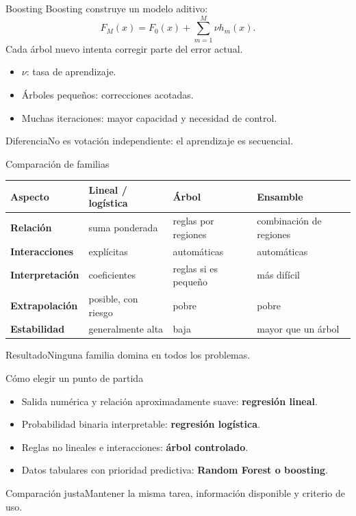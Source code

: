 \documentclass[aspectratio=169,10pt]{beamer}
\newcommand{\concepto}[1]{\textcolor{UAPTeal}{\textbf{#1}}}
\begin{document}
\begin{frame}{Boosting}
  \small
  Boosting construye un modelo aditivo:
  \[F_M(x)=F_0(x)+\sum_{m=1}^{M}\nu h_m(x).\]
  Cada árbol nuevo intenta corregir parte del error actual.
  \begin{itemize}
    \item $\nu$: tasa de aprendizaje.
    \item Árboles pequeños: correcciones acotadas.
    \item Muchas iteraciones: mayor capacidad y necesidad de control.
  \end{itemize}
  \begin{alertblock}{Diferencia}No es votación independiente: el aprendizaje es secuencial.\end{alertblock}
\end{frame}

\begin{frame}{Comparación de familias}
  \scriptsize
  \begin{tabularx}{\textwidth}{>{\bfseries}p{}p{}p{}X}\toprule
  Aspecto & Lineal / logística & Árbol & Ensamble\\\midrule
  Relación & suma ponderada & reglas por regiones & combinación de regiones\\
  Interacciones & explícitas & automáticas & automáticas\\
  Interpretación & coeficientes & reglas si es pequeño & más difícil\\
  Extrapolación & posible, con riesgo & pobre & pobre\\
  Estabilidad & generalmente alta & baja & mayor que un árbol\\\bottomrule
  \end{tabularx}
  \begin{block}{Resultado}Ninguna familia domina en todos los problemas.\end{block}
\end{frame}

\begin{frame}{Cómo elegir un punto de partida}
  \small
  \begin{itemize}
    \item Salida numérica y relación aproximadamente suave: \concepto{regresión lineal}.
    \item Probabilidad binaria interpretable: \concepto{regresión logística}.
    \item Reglas no lineales e interacciones: \concepto{árbol controlado}.
    \item Datos tabulares con prioridad predictiva: \concepto{Random Forest o boosting}.
  \end{itemize}
  \begin{block}{Comparación justa}Mantener la misma tarea, información disponible y criterio de uso.\end{block}
\end{frame}
\end{document}
